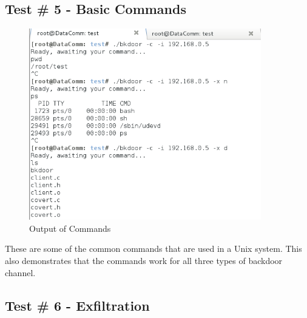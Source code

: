 \documentclass[titlepage]{article}
\begin{document}
\clearpage

\subsection{Test \# 5 - Basic Commands}

\begin{figure}[htb]                                                                       
  \begin{center}
    \includegraphics[width=0.9\textwidth]{Pictures/Commands.png}
  \end{center}
  \caption{Output of Commands}
  \label{fig:commands}
\end{figure}

These are some of the common commands that are used in a Unix system.  This also demonstrates that
the commands work for all three types of backdoor channel.

\clearpage

\subsection{Test \# 6 - Exfiltration}
\end{document}
